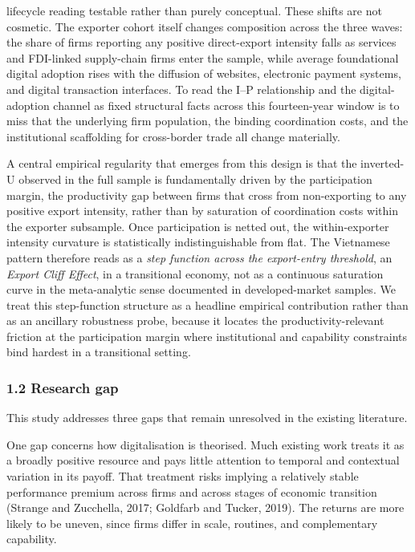 \documentclass[12pt,a4paper]{article}
\begin{document}
lifecycle reading testable rather than purely conceptual. These shifts
are not cosmetic. The exporter cohort itself changes composition across
the three waves: the share of firms reporting any positive direct-export
intensity falls as services and FDI-linked supply-chain firms enter the
sample, while average foundational digital adoption rises with the
diffusion of websites, electronic payment systems, and digital
transaction interfaces. To read the I--P relationship and the
digital-adoption channel as fixed structural facts across this
fourteen-year window is to miss that the underlying firm population, the
binding coordination costs, and the institutional scaffolding for
cross-border trade all change materially.

A central empirical regularity that emerges from this design is that the
inverted-U observed in the full sample is fundamentally driven by the
participation margin, the productivity gap between firms that cross from
non-exporting to any positive export intensity, rather than by
saturation of coordination costs within the exporter subsample. Once
participation is netted out, the within-exporter intensity curvature is
statistically indistinguishable from flat. The Vietnamese pattern
therefore reads as a \emph{step function across the export-entry
threshold}, an \emph{Export Cliff Effect}, in a transitional economy,
not as a continuous saturation curve in the meta-analytic sense
documented in developed-market samples. We treat this step-function
structure as a headline empirical contribution rather than as an
ancillary robustness probe, because it locates the productivity-relevant
friction at the participation margin where institutional and capability
constraints bind hardest in a transitional setting.

\hypertarget{12-research-gap}{%
\subsubsection{1.2 Research gap}\label{12-research-gap}}

This study addresses three gaps that remain unresolved in the existing
literature.

One gap concerns how digitalisation is theorised. Much existing work
treats it as a broadly positive resource and pays little attention to
temporal and contextual variation in its payoff. That treatment risks
implying a relatively stable performance premium across firms and across
stages of economic transition (Strange and Zucchella, 2017; Goldfarb and
Tucker, 2019). The returns are more likely to be uneven, since firms
differ in scale, routines, and complementary capability.
\end{document}
